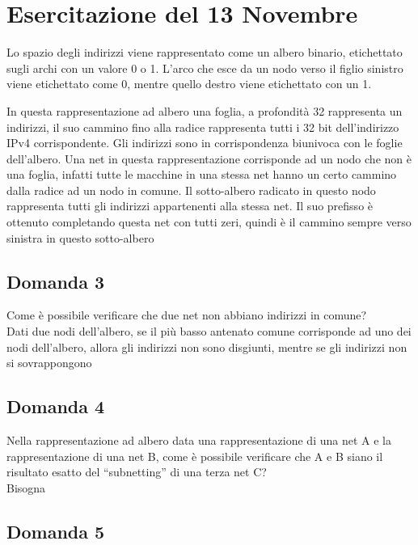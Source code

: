 \documentclass{article}
\numberwithin{equation}{subsection}
\begin{document}
\clearpage

\section{Esercitazione del 13 Novembre}

Lo spazio degli indirizzi viene rappresentato come un albero binario, etichettato sugli archi con un valore 0 o 1. L'arco che esce da un nodo verso 
il figlio sinistro viene etichettato come 0, mentre quello destro viene etichettato con un 1. 

In questa rappresentazione ad albero una foglia, a profondità 32 rappresenta un indirizzi, il suo cammino fino alla radice rappresenta tutti i 32 bit dell'indirizzo 
IPv4 corrispondente. 
Gli indirizzi sono in corrispondenza biunivoca con le foglie dell'albero. Una net in questa rappresentazione corrisponde ad un nodo che non è una foglia, 
infatti tutte le macchine in una stessa net hanno un certo cammino dalla radice ad un nodo in comune. Il sotto-albero radicato in questo nodo rappresenta tutti gli 
indirizzi appartenenti alla stessa net. 
Il suo prefisso è ottenuto completando questa net con tutti zeri, quindi è il cammino sempre verso sinistra in questo sotto-albero


\subsection*{Domanda 3}

Come è possibile verificare che due net non abbiano indirizzi in comune?\\
Dati due nodi dell'albero, se il più basso antenato comune corrisponde ad uno dei nodi dell'albero, allora gli indirizzi non sono disgiunti, 
mentre se gli indirizzi non si sovrappongono %

\subsection*{Domanda 4}

Nella rappresentazione ad albero data una rappresentazione di una net A e la rappresentazione di una net B, come è possibile verificare che A e B siano il risultato 
esatto del ``subnetting'' di una terza net C?\\
Bisogna 

\subsection*{Domanda 5}
\end{document}
